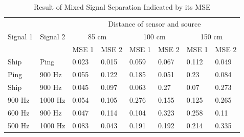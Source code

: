 \documentclass[a4paper]{jpconf}
\begin{document}
\begin{table}[h]
\centering
\caption{Result of Mixed Signal Separation Indicated by its MSE}
\label{table:mse}
\begin{tabular}{|l|l|l|l|l|l|l|l|}
\hline
\multicolumn{1}{|c|}{\multirow{3}{*}{Signal 1}} & \multicolumn{1}{c|}{\multirow{3}{*}{Signal 2}} & \multicolumn{6}{c|}{Distance of sensor and source}                                                                                                                          \\ \cline{3-8} 
\multicolumn{1}{|c|}{}                          & \multicolumn{1}{c|}{}                          & \multicolumn{2}{c|}{85 cm}                              & \multicolumn{2}{c|}{100 cm}                             & \multicolumn{2}{c|}{150 cm}                             \\ \cline{3-8} 
\multicolumn{1}{|c|}{}                          & \multicolumn{1}{c|}{}                          & \multicolumn{1}{c|}{MSE 1} & \multicolumn{1}{c|}{MSE 2} & \multicolumn{1}{c|}{MSE 1} & \multicolumn{1}{c|}{MSE 2} & \multicolumn{1}{c|}{MSE 1} & \multicolumn{1}{c|}{MSE 2} \\ \hline
Ship                                            & Ping                                           & 0.023                      & 0.015                      & 0.059                      & 0.067                      & 0.112                      & 0.049                      \\ \hline
Ping                                            & 900 Hz                                         & 0.055                      & 0.122                      & 0.185                      & 0.051                      & 0.23                       & 0.084                      \\ \hline
Ship                                            & 900 Hz                                         & 0.045                      & 0.097                      & 0.063                      & 0.27                       & 0.07                       & 0.273                      \\ \hline
900 Hz                                          & 1000 Hz                                        & 0.054                      & 0.105                      & 0.276                      & 0.155                      & 0.125                      & 0.265                      \\ \hline
600 Hz                                          & 900 Hz                                         & 0.047                      & 0.114                      & 0.104                      & 0.323                      & 0.258                      & 0.11                       \\ \hline
500 Hz                                          & 1000 Hz                                        & 0.083                      & 0.043                      & 0.191                      & 0.192                      & 0.214                      & 0.335                      \\ \hline
\end{tabular}
\end{table}
\end{document}
